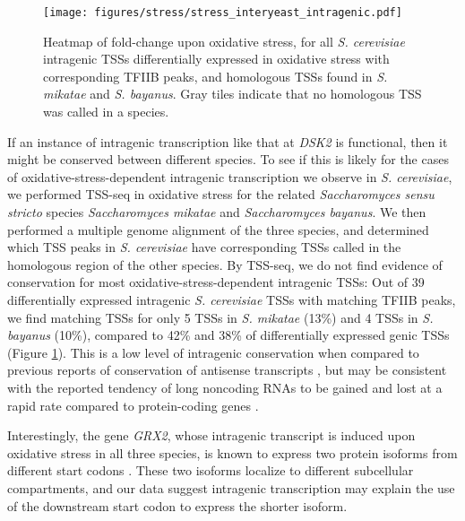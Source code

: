 \begin{figure}[h]
    \texttt{[image: figures/stress/stress\_interyeast\_intragenic.pdf]}
    \caption[Heatmap of fold-change upon oxidative stress, for \textit{S. cerevisiae} intragenic TSSs differentially expressed in oxidative stress, and homologous TSSs found in \textit{S. mikatae} and \textit{S. bayanus}.]{Heatmap of fold-change upon oxidative stress, for all \textit{S. cerevisiae} intragenic TSSs differentially expressed in oxidative stress with corresponding TFIIB peaks, and homologous TSSs found in \textit{S. mikatae} and \textit{S. bayanus}. Gray tiles indicate that no homologous TSS was called in a species.}
    \label{fig:stress_interyeast_intragenic}
\end{figure}

If an instance of intragenic transcription like that at \textit{DSK2} is functional, then it might be conserved between different species.
To see if this is likely for the cases of oxidative-stress-dependent intragenic transcription we observe in \textit{S. cerevisiae}, we performed TSS-seq in oxidative stress for the related \textit{Saccharomyces sensu stricto} species \textit{Saccharomyces mikatae} and \textit{Saccharomyces bayanus}.
We then performed a multiple genome alignment of the three species, and determined which TSS peaks in \textit{S. cerevisiae} have corresponding TSSs called in the homologous region of the other species.
By TSS-seq, we do not find evidence of conservation for most oxidative-stress-dependent intragenic TSSs: Out of 39 differentially expressed intragenic \textit{S. cerevisiae} TSSs with matching TFIIB peaks, we find matching TSSs for only 5 TSSs in \textit{S. mikatae} (13\%) and 4 TSSs in \textit{S. bayanus} (10\%), compared to 42\% and 38\% of differentially expressed genic TSSs (Figure \ref{fig:stress_interyeast_intragenic}).
This is a low level of intragenic conservation when compared to previous reports of conservation of antisense transcripts \citep{yassour2010, rhind2011}, but may be consistent with the reported tendency of long noncoding RNAs to be gained and lost at a rapid rate compared to protein-coding genes \citep{kutter2012}.

Interestingly, the gene \textit{GRX2}, whose intragenic transcript is induced upon oxidative stress in all three species, is known to express two protein isoforms from different start codons \citep{pedrajas2002}.
These two isoforms localize to different subcellular compartments, and our data suggest intragenic transcription may explain the use of the downstream start codon to express the shorter isoform.

